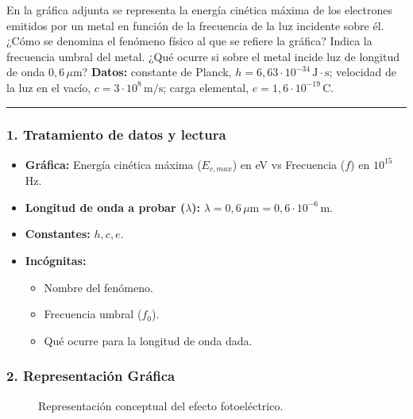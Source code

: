 \begin{cajaenunciado}
En la gráfica adjunta se representa la energía cinética máxima de los electrones emitidos por un metal en función de la frecuencia de la luz incidente sobre él. ¿Cómo se denomina el fenómeno físico al que se refiere la gráfica? Indica la frecuencia umbral del metal. ¿Qué ocurre si sobre el metal incide luz de longitud de onda $0,6\,\mu\text{m}$?
\textbf{Datos:} constante de Planck, $h=6,63\cdot10^{-34}\,\text{J}\cdot\text{s}$; velocidad de la luz en el vacío, $c=3\cdot10^8\,\text{m/s}$; carga elemental, $e=1,6\cdot10^{-19}\,\text{C}$.
\end{cajaenunciado}
\hrule

\subsubsection*{1. Tratamiento de datos y lectura}
\begin{itemize}
    \item \textbf{Gráfica:} Energía cinética máxima ($E_{c,max}$) en eV vs Frecuencia ($f$) en $10^{15}$ Hz.
    \item \textbf{Longitud de onda a probar ($\lambda$):} $\lambda = 0,6 \, \mu\text{m} = 0,6 \cdot 10^{-6} \, \text{m}$.
    \item \textbf{Constantes:} $h, c, e$.
    \item \textbf{Incógnitas:}
    \begin{itemize}
        \item Nombre del fenómeno.
        \item Frecuencia umbral ($f_0$).
        \item Qué ocurre para la longitud de onda dada.
    \end{itemize}
\end{itemize}

\subsubsection*{2. Representación Gráfica}
\begin{figure}[H]
    \centering
    \caption{Representación conceptual del efecto fotoeléctrico.}
\end{figure}

